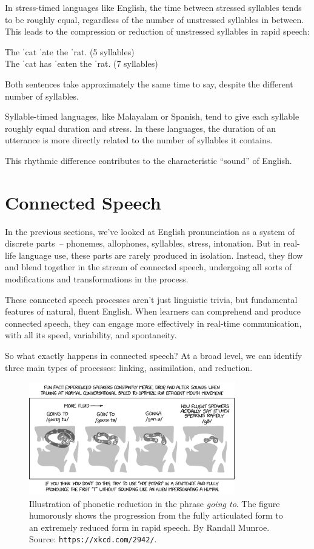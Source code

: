 In stress-timed languages like English, the time between stressed syllables tends to be roughly equal, regardless of the number of unstressed syllables in between. This leads to the compression or reduction of unstressed syllables in rapid speech:

\ea
The ˈcat \phantom{has} ˈate\phantom{en} the ˈrat. \hfill(5 syllables)\\
The ˈcat has ˈeaten the ˈrat. \hfill(7 syllables)
\z

Both sentences take approximately the same time to say, despite the different number of syllables.

Syllable-timed languages, like Malayalam or Spanish, tend to give each syllable roughly equal duration and stress. In these languages, the duration of an utterance is more directly related to the number of syllables it contains.

This rhythmic difference contributes to the characteristic ``sound'' of English.

\section{Connected Speech}

In the previous sections, we've looked at English pronunciation as a system of discrete parts~-- phonemes, allophones, syllables, stress, intonation. But in real-life language use, these parts are rarely produced in isolation. Instead, they flow and blend together in the stream of connected speech, undergoing all sorts of modifications and transformations in the process.

These connected speech processes aren't just linguistic trivia, but fundamental features of natural, fluent English. When learners can comprehend and produce connected speech, they can engage more effectively in real-time communication, with all its speed, variability, and spontaneity.

So what exactly happens in connected speech? At a broad level, we can identify three main types of processes: linking, assimilation, and reduction.

\begin{figure}[ht]
    \centering
    \includegraphics[width=0.8\textwidth]{figures/fluid_speech_2x.png}
    \caption{Illustration of phonetic reduction in the phrase \textit{going to}. The figure humorously shows the progression from the fully articulated form to an extremely reduced form in rapid speech. By Randall Munroe. Source: \texttt{https://xkcd.com/2942/}.}
    \label{fig:phonetic_reduction}
\end{figure}

